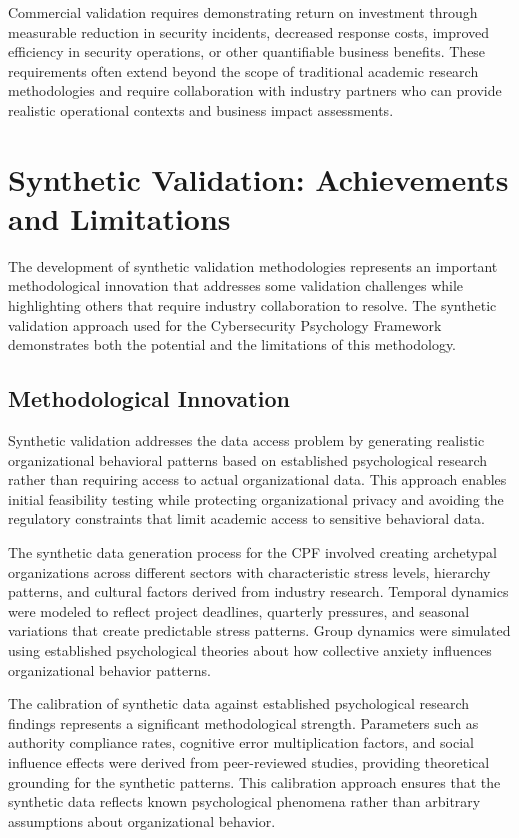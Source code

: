 \documentclass[10pt,twocolumn]{IEEEtran}
\begin{document}
Commercial validation requires demonstrating return on investment through measurable reduction in security incidents, decreased response costs, improved efficiency in security operations, or other quantifiable business benefits. These requirements often extend beyond the scope of traditional academic research methodologies and require collaboration with industry partners who can provide realistic operational contexts and business impact assessments.

\section{Synthetic Validation: Achievements and Limitations}

The development of synthetic validation methodologies represents an important methodological innovation that addresses some validation challenges while highlighting others that require industry collaboration to resolve. The synthetic validation approach used for the Cybersecurity Psychology Framework demonstrates both the potential and the limitations of this methodology.

\subsection{Methodological Innovation}

Synthetic validation addresses the data access problem by generating realistic organizational behavioral patterns based on established psychological research rather than requiring access to actual organizational data. This approach enables initial feasibility testing while protecting organizational privacy and avoiding the regulatory constraints that limit academic access to sensitive behavioral data.

The synthetic data generation process for the CPF involved creating archetypal organizations across different sectors with characteristic stress levels, hierarchy patterns, and cultural factors derived from industry research. Temporal dynamics were modeled to reflect project deadlines, quarterly pressures, and seasonal variations that create predictable stress patterns. Group dynamics were simulated using established psychological theories about how collective anxiety influences organizational behavior patterns.

The calibration of synthetic data against established psychological research findings represents a significant methodological strength. Parameters such as authority compliance rates, cognitive error multiplication factors, and social influence effects were derived from peer-reviewed studies, providing theoretical grounding for the synthetic patterns. This calibration approach ensures that the synthetic data reflects known psychological phenomena rather than arbitrary assumptions about organizational behavior.
\end{document}
